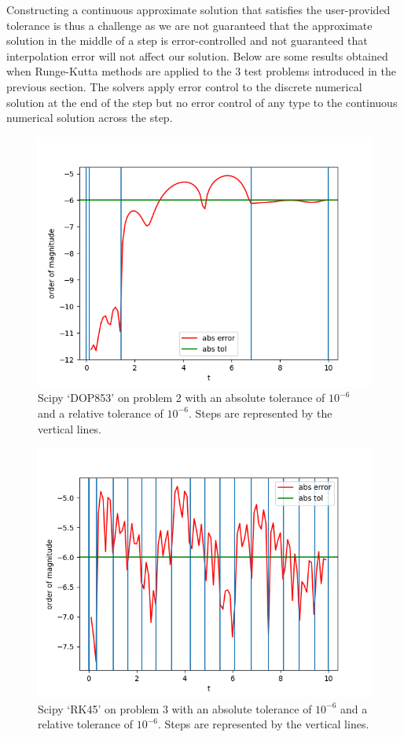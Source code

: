 \documentclass{article}
\begin{document}
Constructing a continuous approximate solution that satisfies the user-provided tolerance is thus a challenge as we are not guaranteed that the approximate solution in the middle of a step is error-controlled and not guaranteed that interpolation error will not affect our solution. Below are some results obtained when Runge-Kutta methods are applied to the 3 test problems introduced in the previous section. The solvers apply error control to the discrete numerical solution at the end of the step but no error control of any type to the continuous numerical solution across the step.

\begin{figure}[H]
\centering
\includegraphics[width=0.7\linewidth]{./figures/no_middle_step_error_control_p2_dop853}
\caption{Scipy `DOP853' on problem 2 with an absolute tolerance of $10^{-6}$ and a relative tolerance of $10^{-6}$. Steps are represented by the vertical lines.}
\label{fig:no_middle_step_error_control_p2_dop853}
\end{figure}

\begin{figure}[H]
\centering
\includegraphics[width=0.7\linewidth]{./figures/no_middle_step_error_control_p3_rk45}
\caption{Scipy `RK45' on problem 3 with an absolute tolerance of $10^{-6}$ and a relative tolerance of $10^{-6}$. Steps are represented by the vertical lines.}
\label{fig:no_middle_step_error_control_p3_rk45}
\end{figure}
\end{document}
